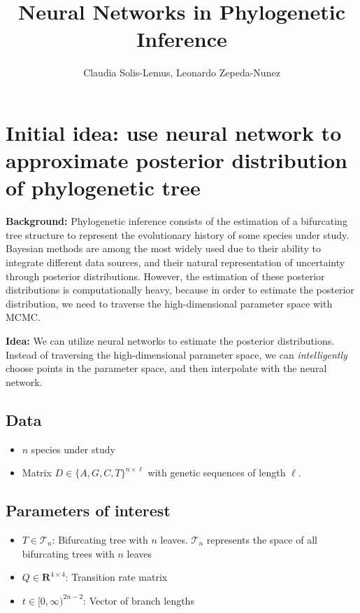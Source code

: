 \documentclass[]{article}
\title{Neural Networks in Phylogenetic Inference}
\author{Claudia Solis-Lemus, Leonardo Zepeda-Nunez}
\date{}
\providecommand{\tightlist}{%
  \setlength{\itemsep}{0pt}\setlength{\parskip}{0pt}}
\begin{document}
\maketitle

\hypertarget{initial-idea-use-neural-network-to-approximate-posterior-distribution-of-phylogenetic-tree}{%
\section{Initial idea: use neural network to approximate posterior
distribution of phylogenetic
tree}\label{initial-idea-use-neural-network-to-approximate-posterior-distribution-of-phylogenetic-tree}}

\textbf{Background:} Phylogenetic inference consists of the estimation
of a bifurcating tree structure to represent the evolutionary history of
some species under study. Bayesian methods are among the most widely
used due to their ability to integrate different data sources, and their
natural representation of uncertainty through posterior distributions.
However, the estimation of these posterior distributions is
computationally heavy, because in order to estimate the posterior
distribution, we need to traverse the high-dimensional parameter space
with MCMC.

\textbf{Idea:} We can utilize neural networks to estimate the posterior
distributions. Instead of traversing the high-dimensional parameter
space, we can \emph{intelligently} choose points in the parameter space,
and then interpolate with the neural network.

\hypertarget{data}{%
\subsection{Data}\label{data}}

\begin{itemize}
\tightlist
\item
  \(n\) species under study
\item
  Matrix \(D \in \{A,G,C,T\}^{n \times \ell}\) with genetic sequences of
  length \(\ell\).
\end{itemize}

\hypertarget{parameters-of-interest}{%
\subsection{Parameters of interest}\label{parameters-of-interest}}

\begin{itemize}
\tightlist
\item
  \(T \in \mathcal{T}_n\): Bifurcating tree with \(n\) leaves.
  \(\mathcal{T}_n\) represents the space of all bifurcating trees with
  \(n\) leaves
\item
  \(Q \in \mathbf{R}^{4 \times 4}\): Transition rate matrix
\item
  \(t \in [0,\infty)^{2n-2}\): Vector of branch lengths
\end{itemize}
\end{document}
